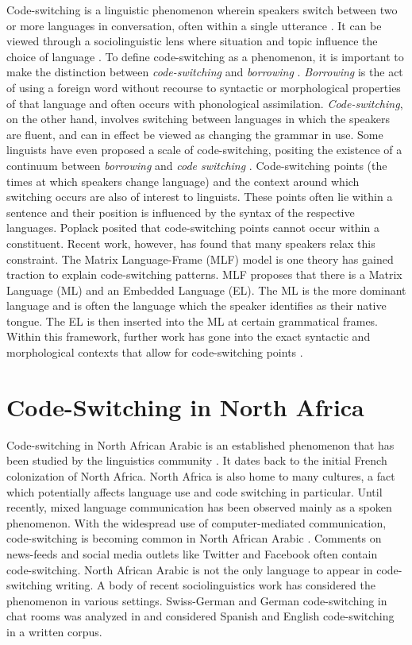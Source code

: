 \documentclass[10pt, a4paper]{article}
\begin{document}
Code-switching is a linguistic phenomenon wherein speakers switch
between two or more languages in conversation, often within a single
utterance \cite{bullock2009cambridge}.  It can be viewed through a
sociolinguistic lens where situation and topic influence the
choice of language \cite{kachru1977linguistic}. To define code-switching as a phenomenon, it is
important to make the distinction between \emph{code-switching} and
\emph{borrowing}%
. \emph{Borrowing} is the act of using a foreign word
without recourse to syntactic or morphological properties of that
language and often occurs with phonological
assimilation. \emph{Code-switching}, on the other hand, involves
switching between languages in which the speakers are fluent, and can
in effect be viewed as changing the grammar in use. Some linguists
have even proposed a scale of code-switching, positing the existence
of a continuum between \emph{borrowing} and \emph{code switching} \cite{auer1999codeswitching}.
Code-switching points (the times at which speakers change language)
and the context around which switching occurs are also of interest to
linguists. These points often lie within a sentence and their position
is influenced by the syntax of the respective languages. Poplack
\cite{poplack1988contrasting} posited that code-switching points
cannot occur within a constituent. Recent work, however, has found
that many speakers relax this constraint. The Matrix Language-Frame
(MLF) model is one theory has gained traction \cite{myers1993common}
to explain code-switching patterns.  MLF proposes that there is a
Matrix Language (ML) and an Embedded Language (EL). The ML is the more
dominant language and is often the language which the speaker
identifies as their native tongue. The EL is then inserted into the ML
at certain grammatical frames. Within this framework, further work has
gone into the exact syntactic and morphological contexts that allow
for code-switching points \cite{myers2001calculating}.

\section{Code-Switching in North Africa}
Code-switching in North African Arabic is an established phenomenon
that has been studied by the linguistics community
\cite{bentahila1983syntax}. It dates back to the initial French
colonization of North Africa. North Africa is also home to many
cultures, a fact which potentially affects language use and code
switching in particular. Until recently, mixed language communication
has been observed mainly as a spoken phenomenon. With the widespread
use of computer-mediated communication, code-switching is becoming
common in North African Arabic \cite{Salia-11}. Comments on news-feeds
and social media outlets like Twitter and Facebook often contain
code-switching.  North African Arabic is not the only language to
appear in code-switching writing. A body of recent sociolinguistics
work has considered the phenomenon in various settings. Swiss-German
and German code-switching in chat rooms was analyzed in
 and 
considered Spanish and English code-switching in a written corpus.
\end{document}
